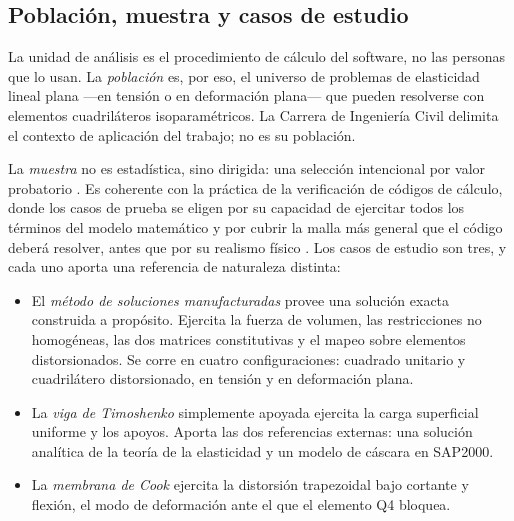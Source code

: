 \subsection{Población, muestra y casos de estudio}
\label{sec:poblacion}

La unidad de análisis es el procedimiento de cálculo del software, no las personas que lo usan. La \emph{población} es, por eso, el universo de problemas de elasticidad lineal plana —en tensión o en deformación plana— que pueden resolverse con elementos cuadriláteros isoparamétricos. La Carrera de Ingeniería Civil delimita el contexto de aplicación del trabajo; no es su población.

La \emph{muestra} no es estadística, sino dirigida: una selección intencional por valor probatorio \autocite[p.~215]{sampieri2018metodologia}. Es coherente con la práctica de la verificación de códigos de cálculo, donde los casos de prueba se eligen por su capacidad de ejercitar todos los términos del modelo matemático y por cubrir la malla más general que el código deberá resolver, antes que por su realismo físico \autocite{oberkampf2010vv}. Los casos de estudio son tres, y cada uno aporta una referencia de naturaleza distinta:

\begin{itemize}
    \item El \emph{método de soluciones manufacturadas} provee una solución exacta construida a propósito. Ejercita la fuerza de volumen, las restricciones no homogéneas, las dos matrices constitutivas y el mapeo sobre elementos distorsionados. Se corre en cuatro configuraciones: cuadrado unitario y cuadrilátero distorsionado, en tensión y en deformación plana.
    \item La \emph{viga de Timoshenko} simplemente apoyada ejercita la carga superficial uniforme y los apoyos. Aporta las dos referencias externas: una solución analítica de la teoría de la elasticidad y un modelo de cáscara en SAP2000.
    \item La \emph{membrana de Cook} ejercita la distorsión trapezoidal bajo cortante y flexión, el modo de deformación ante el que el elemento Q4 bloquea.
\end{itemize}

